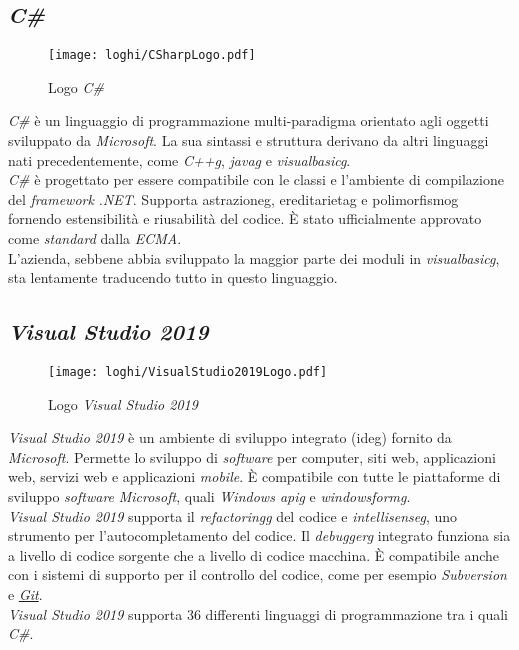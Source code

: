 \subsection*{\textit{C\#}}
\begin{figure}[!h] 
    \centering 
    \texttt{[image: loghi/CSharpLogo.pdf]} 
    \caption{Logo \textit{C\#}}
 \end{figure}
\noindent \textit{C\#} è un linguaggio di programmazione multi-paradigma orientato agli oggetti
sviluppato da \textit{Microsoft}. La sua sintassi e struttura derivano da altri linguaggi nati
precedentemente, come \textit{\gls{C++g}}, \textit{\gls{javag}} e \textit{\gls{visualbasicg}}.\\
\textit{C\#} è progettato per essere compatibile con le classi e l’ambiente di compilazione
del \textit{framework} \textit{.NET}. Supporta \gls{astrazioneg}, \gls{ereditarietag} e \gls{polimorfismog}
fornendo estensibilità e riusabilità del codice.
È stato ufficialmente approvato come \textit{standard} dalla \textit{ECMA}.\\
L'azienda, sebbene abbia sviluppato la maggior parte dei moduli
in \textit{\gls{visualbasicg}}, sta lentamente traducendo tutto in questo linguaggio.

\subsection*{\textit{Visual Studio 2019}}
\begin{figure}[!h] 
    \centering 
    \texttt{[image: loghi/VisualStudio2019Logo.pdf]} 
    \caption{Logo \textit{Visual Studio 2019}}
 \end{figure}
\noindent \textit{Visual Studio 2019} è un ambiente di sviluppo integrato (\gls{ideg}) fornito da \textit{Microsoft}.
Permette lo sviluppo di \textit{software} per computer, siti web, applicazioni web, servizi web
e applicazioni \textit{mobile}. È compatibile con tutte le piattaforme di sviluppo
\textit{software} \textit{Microsoft}, quali \textit{Windows \gls{apig}} e \textit{\gls{windowsformg}}.\\
\textit{Visual Studio 2019} supporta il \textit{\gls{refactoringg}} del codice e \textit{\gls{intellisenseg}}, uno strumento per
l’autocompletamento del codice. Il \textit{\gls{debuggerg}} integrato funziona sia a
livello di codice sorgente che a livello di codice macchina. È compatibile anche con i sistemi di supporto per il controllo del codice,
come per esempio \textit{Subversion} e \textit{\hyperref[sec:git]{Git}}.\\
\textit{Visual Studio 2019} supporta 36 differenti linguaggi di 
programmazione tra i quali \textit{C\#}.


